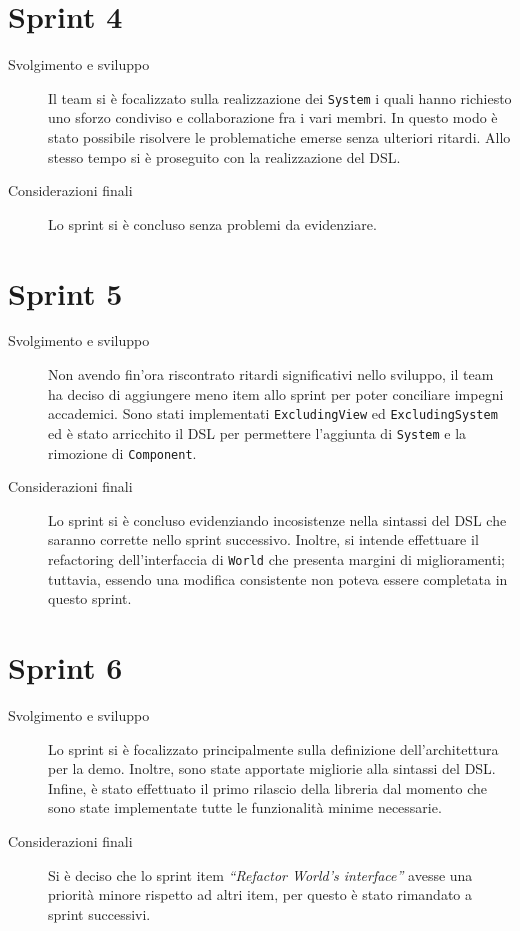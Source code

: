 \section{Sprint 4}\label{sec:sprint-4}
\begin{description}
    \item[Svolgimento e sviluppo] Il team si è focalizzato sulla realizzazione dei \texttt{System} i quali hanno
    richiesto uno sforzo condiviso e collaborazione fra i vari membri.
    In questo modo è stato possibile risolvere le problematiche emerse senza ulteriori ritardi.
    Allo stesso tempo si è proseguito con la realizzazione del DSL\@.
    \item[Considerazioni finali] Lo sprint si è concluso senza problemi da evidenziare.
\end{description}
\section{Sprint 5}\label{sec:sprint-5}
\begin{description}
    \item[Svolgimento e sviluppo] Non avendo fin'ora riscontrato ritardi significativi nello sviluppo, il team ha deciso
    di aggiungere meno item allo sprint per poter conciliare impegni accademici.
    Sono stati implementati \texttt{ExcludingView} ed \texttt{ExcludingSystem} ed è stato arricchito il DSL per
    permettere l'aggiunta di \texttt{System} e la rimozione di \texttt{Component}.
    \item[Considerazioni finali] Lo sprint si è concluso evidenziando incosistenze nella sintassi del DSL che saranno
    corrette nello sprint successivo.
    Inoltre, si intende effettuare il refactoring dell'interfaccia di \texttt{World} che presenta margini di
    miglioramenti;
    tuttavia, essendo una modifica consistente non poteva essere completata in questo sprint.
\end{description}
\section{Sprint 6}\label{sec:sprint-6}
\begin{description}
    \item[Svolgimento e sviluppo] Lo sprint si è focalizzato principalmente sulla definizione dell'architettura per la
    demo.
    Inoltre, sono state apportate migliorie alla sintassi del DSL\@.
    Infine, è stato effettuato il primo rilascio della libreria dal momento che sono state implementate tutte le
    funzionalità minime necessarie.
    \item[Considerazioni finali] Si è deciso che lo sprint item \textit{``Refactor World's interface''} avesse una
    priorità minore rispetto ad altri item, per questo è stato rimandato a sprint successivi.
\end{description}
